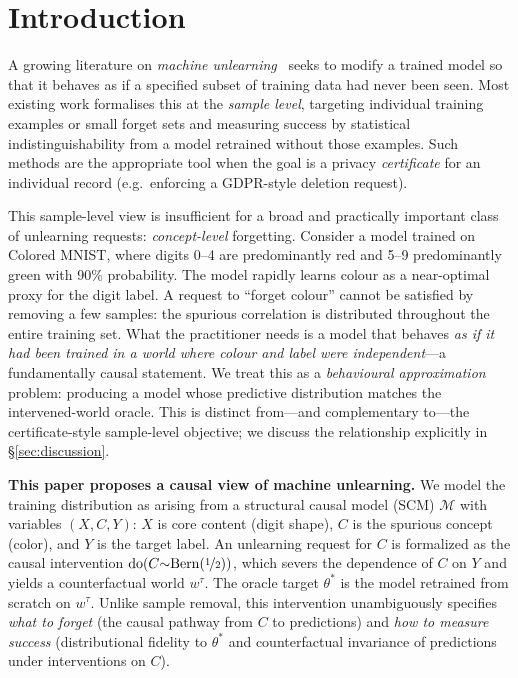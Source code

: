 \documentclass{article}
\newcommand{\doop}{\mathrm{do}}
\begin{document}
\section{Introduction}
\label{sec:intro}

A growing literature on \emph{machine
unlearning}~\cite{cao2015machine,guo2020certified,gupta2021adaptive,sekhari2021remember,bourtoule2021machine}
seeks to modify a trained model so that it behaves as if a specified subset of training
data had never been seen.  Most existing work formalises this at the \emph{sample
level}, targeting individual training examples or small forget sets and measuring
success by statistical indistinguishability from a model retrained without those
examples.  Such methods are the appropriate tool when the goal is a privacy
\emph{certificate} for an individual record (e.g.\ enforcing a GDPR-style
deletion request).

This sample-level view is insufficient for a broad and practically important
class of unlearning requests: \emph{concept-level} forgetting.  Consider a
model trained on Colored MNIST, where digits 0--4 are predominantly red and
5--9 predominantly green with 90\% probability.  The model rapidly learns
colour as a near-optimal proxy for the digit label.  A request to ``forget
colour'' cannot be satisfied by removing a few samples: the spurious
correlation is distributed throughout the entire training set.  What the
practitioner needs is a model that behaves \emph{as if it had been trained
in a world where colour and label were independent}---a fundamentally causal
statement.  We treat this as a \emph{behavioural approximation} problem:
producing a model whose predictive distribution matches the intervened-world
oracle.  This is distinct from---and complementary to---the certificate-style
sample-level objective; we discuss the relationship explicitly in
\S\ref{sec:discussion}.

\textbf{This paper proposes a causal view of machine unlearning.}  We model the
training distribution as arising from a structural causal model (SCM)
$\mathcal{M}$ with variables $(X, C, Y)$: $X$ is core content (digit shape),
$C$ is the spurious concept (color), and $Y$ is the target label.  An unlearning
request for $C$ is formalized as the causal intervention
$\doop(C{\sim}\mathrm{Bern}(\nicefrac{1}{2}))$, which severs the dependence of
$C$ on $Y$ and yields a counterfactual world $w^\tau$.  The oracle target
$\theta^*$ is the model retrained from scratch on $w^\tau$.  Unlike sample
removal, this intervention unambiguously specifies \emph{what to forget} (the
causal pathway from $C$ to predictions) and \emph{how to measure success}
(distributional fidelity to $\theta^*$ and counterfactual invariance of
predictions under interventions on $C$).
\end{document}
